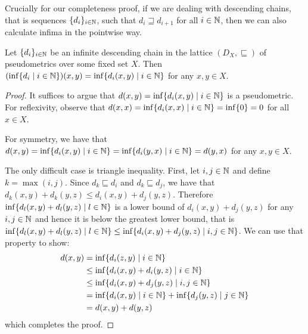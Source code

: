 Crucially for our completeness proof, if we are dealing with descending chains, that is sequences $\{d_i\}_{i \in \mathbb{N}}$, such that $d_i \sqsupseteq d_{i+1}$ for all $i \in \mathbb{N}$, then we can also calculate infima in the pointwise way.
\begin{lemma}\label{c2:lem:chain_pointwise_inf}
    Let $\{d_i\}_{i \in \mathbb{N}}$ be an infinite descending chain in the lattice $(D_X, \sqsubseteq)$ of pseudometrics over some fixed set $X$. Then $(\inf\{d_i \mid i \in \mathbb{N}\})(x,y) = \inf \{d_i(x,y) \mid i \in \mathbb{N} \}$ for any $x,y \in X$.
\end{lemma}
\begin{proof}
    It suffices to argue that $d(x,y) = \inf \{d_i(x,y) \mid i \in \mathbb{N} \}$ is a pseudometric. For reflexivity, observe that $d(x,x) = \inf \{d_i(x,x) \mid i \in \mathbb{N} \} = \inf \{ 0 \} = 0 $ for all $x \in X$. 
    
    For symmetry, we have that $d(x,y) = \inf \{d_i(x,y) \mid i \in \mathbb{N} \} =  \inf \{d_i(y,x) \mid i \in \mathbb{N} \}=d(y,x)$ for any $x, y \in X$. 
    
    The only difficult case is triangle inequality. First, let $i, j \in \mathbb{N}$ and define $k = \max(i,j)$. Since $d_k \sqsubseteq d_i$ and $d_k \sqsubseteq d_j$, we have that $d_k(x,y) + d_k(y,z) \leq d_i(x,y) + d_j(y,z)$.
    Therefore $\inf \{d_l(x,y) + d_l(y,z) \mid l \in \mathbb{N}\}$ is a lower bound of $d_i(x,y) + d_j(y,z)$ for any $i, j \in \mathbb{N}$ and hence it is below the greatest lower bound, that is $\inf \{d_l(x,y) + d_l(y,z) \mid l \in \mathbb{N}\} \leq \inf \{d_i(x,y) + d_j(y,z) \mid i,j \in \mathbb{N}\}$. We can use that property to show:
    \vspace{-2.5em}
    \begin{align*}
    	d(x,y) &= \inf \{d_i(z,y) \mid i \in \mathbb{N}\} \\
    	&\leq \inf \{d_i(x,y) + d_i(y,z) \mid i \in \mathbb{N}\}\\
    	&\leq \inf \{d_i(x,y) + d_j(y,z) \mid i,j \in \mathbb{N}\}\\
    	&= \inf \{d_i(x,y) \mid i \in \mathbb{N}\} + \inf \{d_j(y,z) \mid j \in \mathbb{N}\}\\
    	&= d(x,y) + d(y,z)
    \end{align*}
	which completes the proof.
\end{proof}
